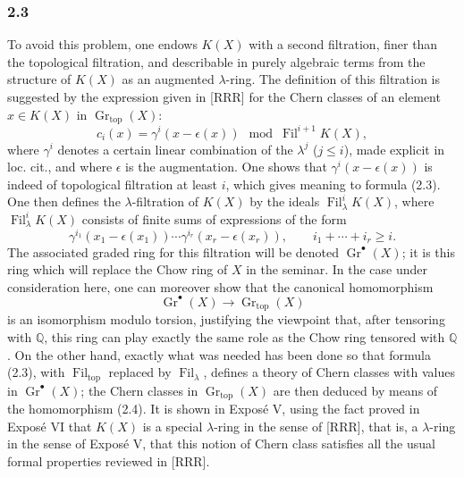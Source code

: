 \documentclass[11pt]{article}
\newcommand{\Gr}{\operatorname{Gr}}
\newcommand{\Fil}{\operatorname{Fil}}
\begin{document}
\subsubsection*{2.3}
To avoid this problem, one endows $K(X)$ with a second filtration, finer than the topological filtration, and describable in purely algebraic terms from the structure of $K(X)$ as an augmented $\lambda$-ring. The definition of this filtration is suggested by the expression given in [RRR] for the Chern classes of an element $x\in K(X)$ in $\Gr_{\mathrm{top}}(X)$:
\begin{equation}\tag{2.3}
c_i(x)=\gamma^i(x-\epsilon(x))\mod \Fil^{i+1}K(X),
\end{equation}
where $\gamma^i$ denotes a certain linear combination of the $\lambda^j$ ($j\le i$), made explicit in loc. cit., and where $\epsilon$ is the augmentation. One shows that $\gamma^i(x-\epsilon(x))$ is indeed of topological filtration at least $i$, which gives meaning to formula (2.3). One then defines the $\lambda$-filtration of $K(X)$ by the ideals $\Fil^i_\lambda K(X)$, where $\Fil^i_\lambda K(X)$ consists of finite sums of expressions of the form
\[
\gamma^{i_1}(x_1-\epsilon(x_1))\cdots \gamma^{i_r}(x_r-\epsilon(x_r)),\qquad i_1+\cdots+i_r\ge i.
\]
The associated graded ring for this filtration will be denoted $\Gr^\bullet(X)$; it is this ring which will replace the Chow ring of $X$ in the seminar. In the case under consideration here, one can moreover show that the canonical homomorphism
\begin{equation}\tag{2.4}
\Gr^\bullet(X)\longrightarrow \Gr_{\mathrm{top}}(X)
\end{equation}
is an isomorphism modulo torsion, justifying the viewpoint that, after tensoring with $\mathbb Q$, this ring can play exactly the same role as the Chow ring tensored with $\mathbb Q$. On the other hand, exactly what was needed has been done so that formula (2.3), with $\Fil_{\mathrm{top}}$ replaced by $\Fil_\lambda$, defines a theory of Chern classes with values in $\Gr^\bullet(X)$; the Chern classes in $\Gr_{\mathrm{top}}(X)$ are then deduced by means of the homomorphism (2.4). It is shown in Exposé V, using the fact proved in Exposé VI that $K(X)$ is a special $\lambda$-ring in the sense of [RRR], that is, a $\lambda$-ring in the sense of Exposé V, that this notion of Chern class satisfies all the usual formal properties reviewed in [RRR].
\end{document}

